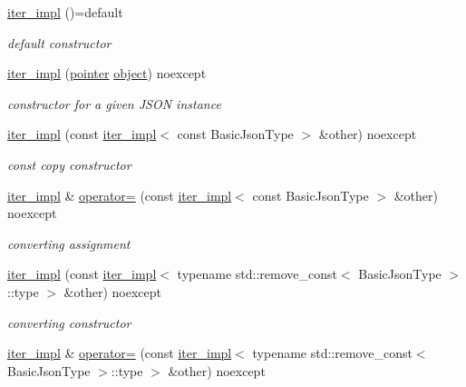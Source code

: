 \begin{DoxyCompactItemize}
\item 
\hyperlink{classnlohmann_1_1detail_1_1iter__impl_a19aa457f9c4af1b7e3af59839132cc5c}{iter\+\_\+impl} ()=default
\begin{DoxyCompactList}\small\item\em default constructor \end{DoxyCompactList}\item 
\hyperlink{classnlohmann_1_1detail_1_1iter__impl_a88a00484ac201c52fc5f613d88a2918b}{iter\+\_\+impl} (\hyperlink{classnlohmann_1_1detail_1_1iter__impl_a69e52f890ce8c556fd68ce109e24b360}{pointer} \hyperlink{namespacenlohmann_1_1detail_a1ed8fc6239da25abcaf681d30ace4985aa8cfde6331bd59eb2ac96f8911c4b666}{object}) noexcept
\begin{DoxyCompactList}\small\item\em constructor for a given J\+S\+ON instance \end{DoxyCompactList}\item 
\hyperlink{classnlohmann_1_1detail_1_1iter__impl_a71f84fb6e009619f12972bcf9002b8cd}{iter\+\_\+impl} (const \hyperlink{classnlohmann_1_1detail_1_1iter__impl}{iter\+\_\+impl}$<$ const Basic\+Json\+Type $>$ \&other) noexcept
\begin{DoxyCompactList}\small\item\em const copy constructor \end{DoxyCompactList}\item 
\hyperlink{classnlohmann_1_1detail_1_1iter__impl}{iter\+\_\+impl} \& \hyperlink{classnlohmann_1_1detail_1_1iter__impl_a9a5cd7864a8f848ef107d3f5a330f5e7}{operator=} (const \hyperlink{classnlohmann_1_1detail_1_1iter__impl}{iter\+\_\+impl}$<$ const Basic\+Json\+Type $>$ \&other) noexcept
\begin{DoxyCompactList}\small\item\em converting assignment \end{DoxyCompactList}\item 
\hyperlink{classnlohmann_1_1detail_1_1iter__impl_a867f7eb55091be31b013adb3e46816d3}{iter\+\_\+impl} (const \hyperlink{classnlohmann_1_1detail_1_1iter__impl}{iter\+\_\+impl}$<$ typename std\+::remove\+\_\+const$<$ Basic\+Json\+Type $>$\+::type $>$ \&other) noexcept
\begin{DoxyCompactList}\small\item\em converting constructor \end{DoxyCompactList}\item 
\hyperlink{classnlohmann_1_1detail_1_1iter__impl}{iter\+\_\+impl} \& \hyperlink{classnlohmann_1_1detail_1_1iter__impl_a7159ed1cfe7c423a2baef8bea0c94509}{operator=} (const \hyperlink{classnlohmann_1_1detail_1_1iter__impl}{iter\+\_\+impl}$<$ typename std\+::remove\+\_\+const$<$ Basic\+Json\+Type $>$\+::type $>$ \&other) noexcept

\end{DoxyCompactItemize}
